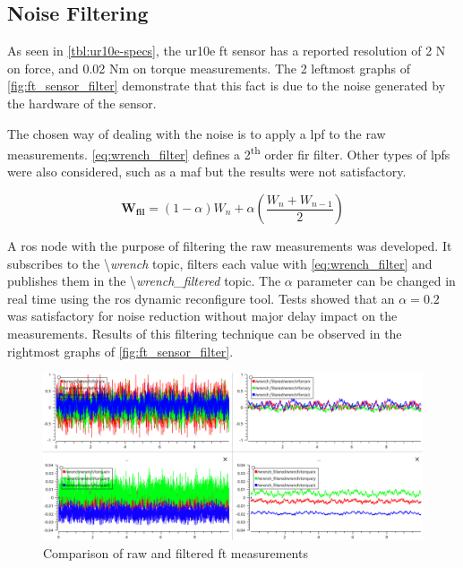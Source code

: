 \subsection{Noise Filtering}


\par As seen in \autoref{tbl:ur10e-specs}, the \ac{ur10e} \ac{ft} sensor has a reported resolution of 2 N on force, and 0.02 Nm on torque measurements. The 2 leftmost graphs of \autoref{fig:ft_sensor_filter} demonstrate that this fact is due to the noise generated by the hardware of the sensor. 

\par The chosen way of dealing with the noise is to apply a \ac{lpf} to the raw measurements. \autoref{eq:wrench_filter} defines a 2\textsuperscript{th} order \ac{fir} filter. Other types of \acp{lpf} were also considered, such as a \ac{maf} but the results were not satisfactory.

\begin{equation}
    \mathbf{W_{fil}} = (1-\alpha)W_n + \alpha \left(\frac{W_n + W_{n-1}}{2}\right)
    \label{eq:wrench_filter}
\end{equation}

\par A \ac{ros} node with the purpose of filtering the raw measurements was developed. It subscribes to the \textbackslash \textit{wrench} topic, filters each value with \autoref{eq:wrench_filter} and publishes them in the \textbackslash \textit{wrench\_filtered} topic. The $\alpha$ parameter can be changed in real time using the \ac{ros} dynamic reconfigure tool. Tests showed that an $\alpha = 0.2 $ was satisfactory for noise reduction without major delay impact on the measurements. Results of this filtering technique can be observed in the rightmost graphs of \autoref{fig:ft_sensor_filter}.

\begin{figure}[h]
    \centering
    \includegraphics[width=0.9\linewidth]{figs/chp3/ft_sensor_filter.png}
    \caption{Comparison of raw and filtered \ac{ft} measurements}
    \label{fig:ft_sensor_filter}
\end{figure}



